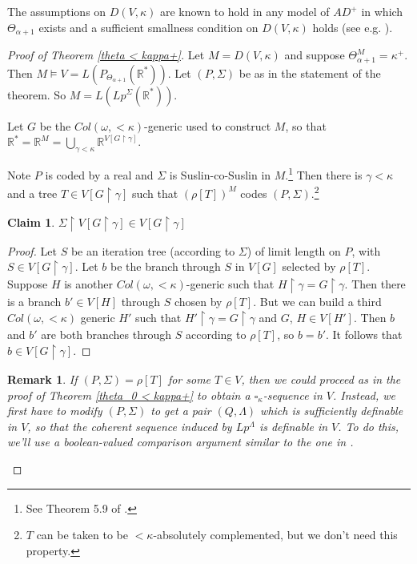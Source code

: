 \documentclass[12pt]{article}
\newtheorem{claim}[theorem]{Claim}
\newtheorem{remark}[theorem]{Remark}
\newcommand\R{\mathbb{R}}
\begin{document}
The assumptions on $D(V,\kappa)$ are known to hold in any model of $AD^+$ in which $\Theta_{\alpha+1}$ exists and a sufficient smallness condition on $D(V,\kappa)$ holds (see e.g. \cite{hm&msc}).

\begin{proof}[Proof of Theorem \ref{theta < kappa+}]
    Let $M = D(V,\kappa)$ and suppose $\Theta_{\alpha+1}^M = \kappa^+$. Then $M\models V = L(P_{\Theta_{\alpha+1}}(\R^*))$. Let $(P,\Sigma)$ be as in the statement of the theorem. So $M = L(Lp^{\Sigma}(\R^*))$.

    Let $G$ be the $Col(\omega,<\kappa)$-generic used to construct $M$, so that $\R^* = \R^M = \bigcup_{\gamma<\kappa}\R^{V[G\upharpoonright\gamma]}$.

    Note $P$ is coded by a real and $\Sigma$ is Suslin-co-Suslin in $M$.\footnote{See Theorem 5.9 of \cite{hm&msc}.} Then there is $\gamma < \kappa$ and a tree $T\in V[G\upharpoonright\gamma]$ such that $(\rho[T])^M$ codes $(P,\Sigma)$.\footnote{$T$ can be taken to be $<\kappa$-absolutely complemented, but we don't need this property.}

    \begin{claim}
        $\Sigma\upharpoonright V[G\upharpoonright\gamma]\in V[G\upharpoonright\gamma]$
    \end{claim}
    \begin{proof}
        
        Let $S$ be an iteration tree (according to $\Sigma$) of limit length on $P$, with $S\in V[G\upharpoonright\gamma]$. Let $b$ be the branch through $S$ in $V[G]$ selected by $\rho[T]$. Suppose $H$ is another $Col(\omega,<\kappa)$-generic such that $H\upharpoonright\gamma = G\upharpoonright\gamma$. Then there is a branch $b'\in V[H]$ through $S$ chosen by $\rho[T]$. But we can build a third $Col(\omega,<\kappa)$ generic $H'$ such that $H'\upharpoonright\gamma = G\upharpoonright\gamma$ and  $G$, $H \in V[H']$. Then $b$ and $b'$ are both branches through $S$ according to $\rho[T]$, so $b = b'$. It follows that $b\in V[G\upharpoonright\gamma]$.
    \end{proof}

    \begin{remark}
        If $(P,\Sigma) = \rho[T]$ for some $T\in V$, then we could proceed as in the proof of Theorem \ref{theta_0 < kappa+} to obtain a $\square_\kappa$-sequence in $V$. Instead, we first have to modify $(P,\Sigma)$ to get a pair $(Q,\Lambda)$ which is sufficiently definable in $V$, so that the coherent sequence induced by $Lp^{\Lambda}$ is definable in $V$. To do this, we'll use a boolean-valued comparison argument similar to the one in \cite{cmi}.
    \end{remark}


\end{proof}
\end{document}
